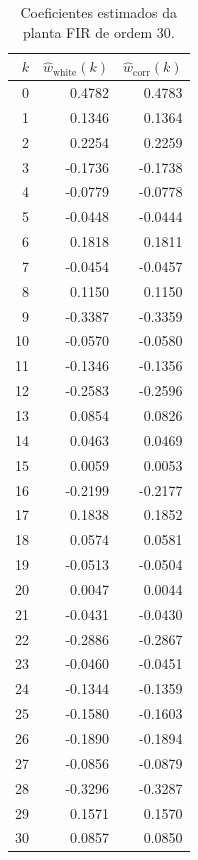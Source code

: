 \documentclass[11pt,a4paper,oneside]{report}
\renewcommand{\arraystretch}{1.18}
\begin{document}
\begin{table}[H]
    \centering
    \caption{Coeficientes estimados da planta FIR de ordem 30.}
    \label{tab:coeficientes-parte2}
    \small
    \setlength{\tabcolsep}{14pt}
    \renewcommand{\arraystretch}{1.08}

    \begin{tabular}{rrr}
        \toprule
        \textbf{\(k\)}
        &
        \textbf{\(\widehat{w}_{\mathrm{white}}(k)\)}
        &
        \textbf{\(\widehat{w}_{\mathrm{corr}}(k)\)}
        \\
        \midrule
         0 &  0.4782 &  0.4783 \\
         1 &  0.1346 &  0.1364 \\
         2 &  0.2254 &  0.2259 \\
         3 & -0.1736 & -0.1738 \\
         4 & -0.0779 & -0.0778 \\
         5 & -0.0448 & -0.0444 \\
         6 &  0.1818 &  0.1811 \\
         7 & -0.0454 & -0.0457 \\
         8 &  0.1150 &  0.1150 \\
         9 & -0.3387 & -0.3359 \\
        10 & -0.0570 & -0.0580 \\
        11 & -0.1346 & -0.1356 \\
        12 & -0.2583 & -0.2596 \\
        13 &  0.0854 &  0.0826 \\
        14 &  0.0463 &  0.0469 \\
        15 &  0.0059 &  0.0053 \\
        16 & -0.2199 & -0.2177 \\
        17 &  0.1838 &  0.1852 \\
        18 &  0.0574 &  0.0581 \\
        19 & -0.0513 & -0.0504 \\
        20 &  0.0047 &  0.0044 \\
        21 & -0.0431 & -0.0430 \\
        22 & -0.2886 & -0.2867 \\
        23 & -0.0460 & -0.0451 \\
        24 & -0.1344 & -0.1359 \\
        25 & -0.1580 & -0.1603 \\
        26 & -0.1890 & -0.1894 \\
        27 & -0.0856 & -0.0879 \\
        28 & -0.3296 & -0.3287 \\
        29 &  0.1571 &  0.1570 \\
        30 &  0.0857 &  0.0850 \\
        \bottomrule
    \end{tabular}
\end{table}
\end{document}

